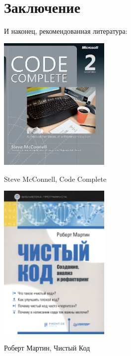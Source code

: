 \documentclass{../text-style}
\begin{document}
\section{Заключение}

И наконец, рекомендованная литература:

\begin{multicols}{2}
    \begin{center}
        \includegraphics[width=0.4\textwidth]{codeCompleteCover.png}
    \end{center}

    Steve McConnell, Code Complete

    \columnbreak

    \begin{center}
        \includegraphics[width=0.4\textwidth]{cleanCodeCover.png}
    \end{center}

    Роберт Мартин, Чистый Код
\end{multicols}
\end{document}
